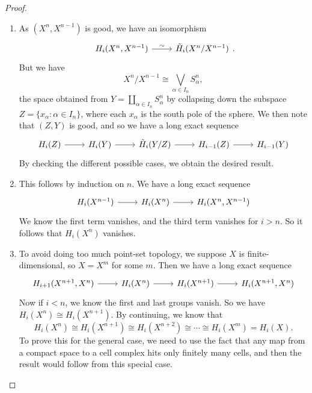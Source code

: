\documentclass[a4paper]{article}
\begin{document}
\begin{proof}\leavevmode
  \begin{enumerate}
    \item As $(X^n, X^{n - 1})$ is good, we have an isomorphism
      \[
        \begin{tikzcd}
          H_i(X^n, X^{n - 1}) \ar[r, "\sim"] & \tilde{H}_i(X^n/X^{n - 1})
        \end{tikzcd}.
      \]
      But we have
      \[
        X^n/X^{n - 1} \cong \bigvee_{\alpha \in I_n} S_\alpha^n,
      \]
      the space obtained from $Y = \coprod_{\alpha \in I_n}S_\alpha^n$ by collapsing down the subspace $Z = \{x_\alpha: \alpha \in I_n\}$, where each $x_\alpha$ is the south pole of the sphere. We then note that $(Z, Y)$ is good, and so we have a long exact sequence
      \[
        \begin{tikzcd}
          H_i(Z) \ar[r] & H_i(Y) \ar[r] & \tilde{H}_i(Y/Z) \ar[r] & H_{i - 1}(Z) \ar[r] & H_{i - 1}(Y)
        \end{tikzcd}
      \]
      By checking the different possible cases, we obtain the desired result.
    \item This follows by induction on $n$. We have a long exact sequence
      \[
        \begin{tikzcd}
          H_i(X^{n - 1}) \ar[r] & H_i(X^n) \ar[r] & H_i(X^n, X^{n - 1})
        \end{tikzcd}
      \]
      We know the first term vanishes, and the third term vanishes for $i > n$. So it follows that $H_i(X^n)$ vanishes.
    \item To avoid doing too much point-set topology, we suppose $X$ is finite-dimensional, so $X = X^m$ for some $m$. Then we have a long exact sequence
      \[
        \begin{tikzcd}
          H_{i + 1} (X^{n + 1}, X^n) \ar[r] & H_i(X^n) \ar[r] & H_i(X^{n + 1}) \ar[r] & H_i(X^{n + 1}, X^n)
        \end{tikzcd}
      \]
      Now if $i < n$, we know the first and last groups vanish. So we have $H_i(X^n) \cong H_i(X^{n + 1})$. By continuing, we know that
      \[
        H_i(X^n) \cong H_i(X^{n + 1}) \cong H_i(X^{n + 2}) \cong \cdots \cong H_i(X^m) = H_i(X).
      \]
      To prove this for the general case, we need to use the fact that any map from a compact space to a cell complex hits only finitely many cells, and then the result would follow from this special case.
  \end{enumerate}
\end{proof}
\end{document}
